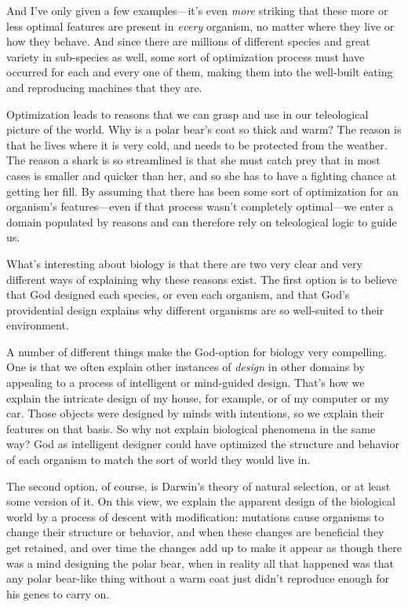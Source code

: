 		And I've only given a few examples---it's even \textit{more} striking that these more or less optimal features are present in \textit{every} organism, no matter where they live or how they behave. And since there are millions of different species and great variety in sub-species as well, some sort of optimization process must have occurred for each and every one of them, making them into the well-built eating and reproducing machines that they are.
		
		Optimization leads to reasons that we can grasp and use in our teleological picture of the world. Why is a polar bear's coat so thick and warm? The reason is that he lives where it is very cold, and needs to be protected from the weather. The reason a shark is so streamlined is that she must catch prey that in most cases is smaller and quicker than her, and so she has to have a fighting chance at getting her fill. By assuming that there has been some sort of optimization for an organism's features---even if that process wasn't completely optimal---we enter a domain populated by reasons and can therefore rely on teleological logic to guide us.
		
		What's interesting about biology is that there are two very clear and very different ways of explaining why these reasons exist. The first option is to believe that God designed each species, or even each organism, and that God's providential design explains why different organisms are so well-suited to their environment.
		
		A number of different things make the God-option for biology very compelling. One is that we often explain other instances of \textit{design} in other domains by appealing to a process of intelligent or mind-guided design. That's how we explain the intricate design of my house, for example, or of my computer or my car. Those objects were designed by minds with intentions, so we explain their features on that basis. So why not explain biological phenomena in the same way? God as intelligent designer could have optimized the structure and behavior of each organism to match the sort of world they would live in.
		
		The second option, of course, is Darwin's theory of natural selection, or at least some version of it. On this view, we explain the apparent design of the biological world by a process of descent with modification: mutations cause organisms to change their structure or behavior, and when these changes are beneficial they get retained, and over time the changes add up to make it appear as though there was a mind designing the polar bear, when in reality all that happened was that any polar bear-like thing without a warm coat just didn't reproduce enough for his genes to carry on.
		

